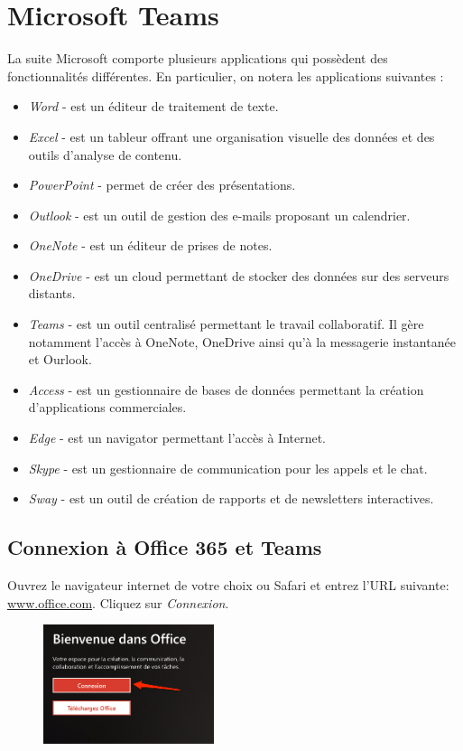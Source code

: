\chapter{Microsoft Teams}\label{teams1}  


La suite Microsoft comporte plusieurs applications qui possèdent des fonctionnalités différentes. En particulier, on notera les applications suivantes :\\

\begin{itemize}
\item \textit{Word} - est un éditeur de traitement de texte.
\item \textit{Excel} - est un tableur offrant une organisation visuelle des données et des outils d'analyse de contenu.
\item \textit{PowerPoint} - permet de créer des présentations.
\item \textit{Outlook} - est un outil de gestion des e-mails proposant un calendrier.
\item \textit{OneNote} - est un éditeur de prises de notes.
\item \textit{OneDrive} - est un cloud permettant de stocker des données sur des serveurs distants.
\item \textit{Teams} - est un outil centralisé permettant le travail collaboratif. Il gère notamment l'accès à OneNote, OneDrive ainsi qu'à la messagerie instantanée et Ourlook.
\item \textit{Access} - est un gestionnaire de bases de données permettant la création d'applications commerciales.
\item \textit{Edge} - est un navigator permettant l'accès à Internet.
\item \textit{Skype} - est un gestionnaire de communication pour les appels et le chat.
\item \textit{Sway} - est un outil de création de rapports et de newsletters interactives.
\end{itemize} 


\section{Connexion à Office 365 et Teams}

Ouvrez le navigateur internet de votre choix ou Safari et entrez l'URL suivante: \url{www.office.com}. Cliquez sur \textit{Connexion}.

\begin{figure}[h]
\includegraphics[width=5cm]{./images/teams/ecran_office_com_crop}
\centering
\end{figure}

